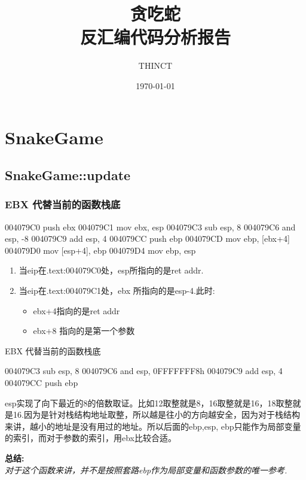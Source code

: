 \documentclass[AutoFakeBold,AutoFakeSlant]{beamer}
\title{\textbf{贪吃蛇}\\反汇编代码分析报告}
\date{\today}
\author{THINCT}
\begin{document}
	\maketitle 
	
	
	\section{SnakeGame}
	\subsection{SnakeGame::update}
	
	\begin{frame}[fragile]
		\frametitle{EBX 代替当前的函数栈底}
		\begin{x86asmcode}
004079C0  push  ebx
004079C1  mov   ebx, esp
004079C3  sub   esp, 8
004079C6  and   esp, -8
004079C9  add   esp, 4
004079CC  push  ebp
004079CD  mov   ebp, [ebx+4]
004079D0  mov   [esp+4], ebp
004079D4  mov   ebp, esp\end{x86asmcode}
		\begin{enumerate}
			\item 当eip在.text:004079C0处，esp所指向的是ret addr. 
			\item 当eip在.text:004079C1处，ebx 所指向的是esp-4.此时:
			\begin{itemize}
					\item ebx+4指向的是ret addr
					\item ebx+8 指向的是第一个参数
			\end{itemize}
		\end{enumerate}
	\end{frame}
	
	
	\begin{frame}[fragile]{EBX 代替当前的函数栈底}
        \begin{x86asmcode}
004079C3  sub   esp, 8
004079C6  and   esp, 0FFFFFFF8h 
004079C9  add   esp, 4
004079CC  push  ebp\end{x86asmcode} 
		esp实现了向下最近的8的倍数取证。比如12取整就是8，16取整就是16，18取整就是16.因为是针对栈结构地址取整，所以越是往小的方向越安全，因为对于栈结构来讲，越小的地址是没有用过的地址。所以后面的ebp,esp, ebp只能作为局部变量的索引，而对于参数的索引，用ebx比较合适。
		
		\textbf {总结:}\\
		\emph {对于这个函数来讲，并不是按照套路ebp作为局部变量和函数参数的唯一参考.} 
	\end{frame}
	
\end{document}
